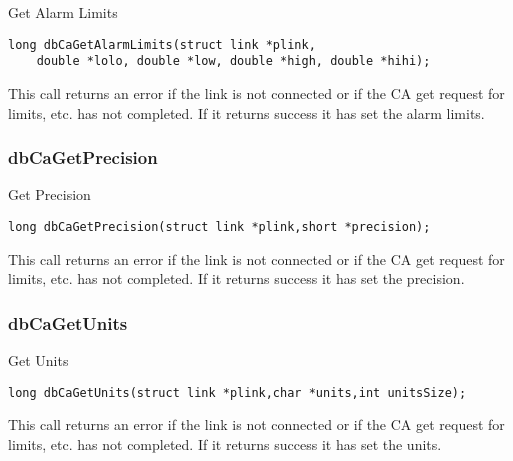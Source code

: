 Get Alarm Limits

\begin{verbatim}
long dbCaGetAlarmLimits(struct link *plink,
    double *lolo, double *low, double *high, double *hihi);
\end{verbatim}

This call returns an error if the link is not connected or if the CA get request for limits, etc. has not completed. If it returns 
success it has set the alarm limits.

\subsubsection{dbCaGetPrecision}

Get Precision

\begin{verbatim}
long dbCaGetPrecision(struct link *plink,short *precision);
\end{verbatim}

This call returns an error if the link is not connected or if the CA get request for limits, etc. has not completed. If it returns 
success it has set the precision.

\subsubsection{dbCaGetUnits}

Get Units

\begin{verbatim}
long dbCaGetUnits(struct link *plink,char *units,int unitsSize);
\end{verbatim}

This call returns an error if the link is not connected or if the CA get request for limits, etc. has not completed. If it returns 
success it has set the units.
